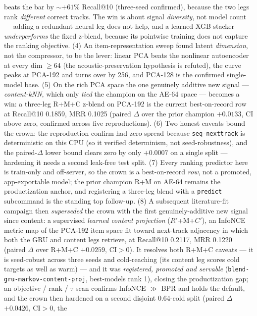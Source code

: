 \documentclass[11pt]{article}
\newcommand{\Rp}{\ensuremath{R'}}
\newcommand{\Cp}{\ensuremath{C'}}
\begin{document}
beats the bar by $\sim$$+61\%$ Recall@10 (three-seed confirmed), because the two
legs rank \emph{different} correct tracks. The win is about signal
\emph{diversity}, not model count --- adding a redundant neural leg does not
help, and a learned XGB stacker \emph{underperforms} the fixed z-blend, because
its pointwise training does not capture the ranking objective. (4) An
item-representation sweep found latent \emph{dimension}, not the compressor, to
be the lever: linear PCA beats the nonlinear autoencoder at every dim $\ge 64$
(the acoustic-preservation hypothesis is refuted), the curve peaks at PCA-192 and
turns over by 256, and PCA-128 is the confirmed single-model base. (5) On the
rich PCA space the one genuinely additive new signal --- \emph{content-kNN},
which only \emph{tied} the champion on the AE-64 space --- becomes a win: a
three-leg R+M+C z-blend on PCA-192 is the current best-on-record row at Recall@10
\num{0.1859}, MRR \num{0.1025} (paired $\Delta$ over the prior champion
$+\num{0.0133}$, CI above zero, confirmed across five reproductions). (6) Two
honest caveats bound the crown: the reproduction confirm had zero spread because
\texttt{seq-nexttrack} is deterministic on this CPU (so it verified determinism,
not seed-robustness), and the paired-$\Delta$ lower bound clears zero by only
$+\num{0.0007}$ on a single split --- hardening it needs a second leak-free test
split. (7) Every ranking predictor here is train-only and off-server, so the
crown is a best-on-record \emph{row}, not a promoted, app-exportable model; the
prior champion R+M on AE-64 remains the productization anchor, and registering a
three-leg blend with a \texttt{predict} subcommand is the standing top follow-up.
(8) A subsequent literature-fit campaign then \emph{superseded} the crown with the
first genuinely-additive new signal since content: a supervised \emph{learned
content projection} (\Rp+M+\Cp), an InfoNCE metric map of the PCA-192 item space
fit toward next-track adjacency in which both the GRU and content legs retrieve, at
Recall@10 \num{0.2117}, MRR \num{0.1220} (paired $\Delta$ over R+M+C $+\num{0.0259}$,
CI$>$0). It resolves both R+M+C caveats --- it is seed-robust across three seeds and
cold-reaching (its content leg scores cold targets as well as warm) --- and it was
\emph{registered, promoted and servable} (\texttt{blend-gru-markov-content-proj},
best-models rank 1), closing the productization gap; an objective / rank / $\tau$
scan confirms InfoNCE $\gg$ BPR and holds the default, and the crown then hardened
on a second disjoint 0.64-cold split (paired $\Delta$ $+\num{0.0426}$, CI$>$0, the
$$
\end{document}
